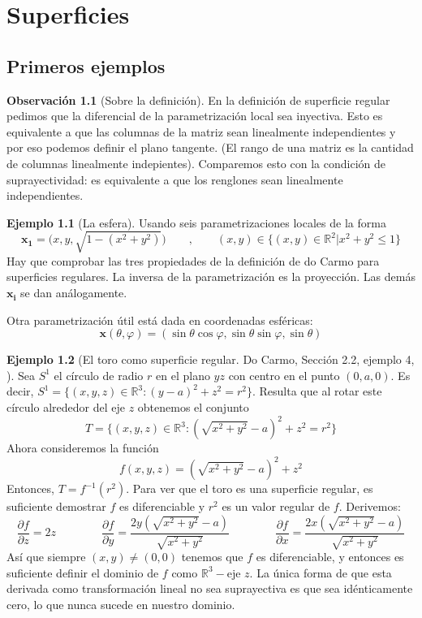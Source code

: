 \documentclass[spanish]{book}
\theoremstyle{definition}
\newtheorem*{obs}{Observación}
\newtheorem*{ejem}{Ejemplo}
\newcommand{\R}{\mathbb{R}}
\begin{document}
\chapter{Superficies}
\section{Primeros ejemplos}
\begin{obs}[Sobre la definición]
	En la definición de superficie regular pedimos que la diferencial de la parametrización local sea inyectiva. Esto es equivalente a que las columnas de la matriz sean linealmente independientes y por eso podemos definir el plano tangente. (El rango de una matriz es la cantidad de columnas linealmente indepientes). Comparemos esto con la condición de suprayectividad: es equivalente a que los renglones sean linealmente independientes.
\end{obs}
\begin{ejem}[La esfera]
	Usando seis parametrizaciones locales de la forma
	\[\mathbf{x_1}=\big(x,y,\sqrt{1-(x^2+y^2)}\big)\qquad,\qquad(x,y)\in\{(x,y)\in\R^2|x^2+y^2\leq1\}\]
	Hay que comprobar las tres propiedades de la definición de do Carmo para superficies regulares. La inversa de la parametrización es la proyección. Las demás $\mathbf{x_i}$ se dan análogamente.
	
	Otra parametrización útil está dada en coordenadas esféricas:
	\[\mathbf{x}(\theta,\varphi)=(\sin{\theta}\cos\varphi,\sin\theta\sin\varphi,\sin\theta)\]
\end{ejem}

\begin{ejem}[El toro como  superficie regular. Do Carmo, Sección 2.2, ejemplo 4, ]
	Sea $S^1$ el círculo de radio $r$ en el plano $yz$ con centro en el punto $(0,a,0)$. Es decir, $S^1=\{(x,y,z)\in\R^3:(y-a)^2+z^2=r^2\}$. Resulta que al rotar este círculo alrededor del eje $z$ obtenemos el conjunto
	\[T=\{(x,y,z)\in\R^3:(\sqrt{x^2+y^2}-a)^2+z^2=r^2\}\]
	Ahora consideremos la función
	\[f(x,y,z)=(\sqrt{x^2+y^2}-a)^2+z^2\]
	Entonces, $T=f^{-1}(r^2)$. Para ver que el toro es una superficie regular, es suficiente demostrar $f$ es diferenciable y $r^2$ es un valor regular de $f$. Derivemos:
	\[\frac{\partial f}{\partial z}=2z\qquad\qquad\frac{\partial f}{\partial y}=\frac{2y(\sqrt{x^2+y^2}-a)}{\sqrt{x^2+y^2}}\qquad\qquad\frac{\partial f}{\partial x}=\frac{2x(\sqrt{x^2+y^2}-a)}{\sqrt{x^2+y^2}}\]
	Así que siempre $(x,y)\neq(0,0)$ tenemos que $f$ es diferenciable, y entonces es suficiente definir el dominio de $f$ como $\R^3-\text{eje }z$. La única forma de que esta derivada como transformación lineal no sea suprayectiva es que sea idénticamente cero, lo que nunca sucede en nuestro dominio.
\end{ejem}
\end{document}
